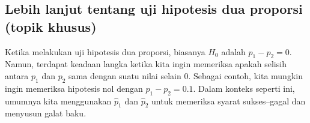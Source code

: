 


 
\subsection{Lebih lanjut tentang uji hipotesis dua proporsi (topik khusus)}

Ketika melakukan uji hipotesis dua proporsi,
biasanya $H_0$ adalah $p_1 - p_2 = 0$. Namun, terdapat keadaan
langka ketika kita ingin memeriksa apakah selisih antara
$p_1$ dan $p_2$ sama dengan suatu nilai selain 0.
Sebagai contoh, kita mungkin ingin memeriksa hipotesis nol
dengan $p_1 - p_2 = 0.1$. %
Dalam konteks seperti ini, umumnya kita menggunakan $\hat{p}_1$ dan
$\hat{p}_2$ untuk memeriksa syarat sukses--gagal dan
menyusun galat baku.

